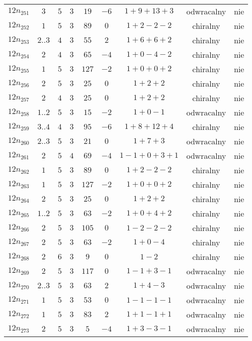 \begin{longtable}{ccccccccc}
$12n_{251}$ & $3$ & $5$ & $3$ & $19$ & $-6$ & $1+9+13+3$ & odwracalny & nie \\
$12n_{252}$ & $1$ & $5$ & $3$ & $89$ & $0$ & $1+2-2-2$ & chiralny & nie \\
$12n_{253}$ & $2..3$ & $4$ & $3$ & $55$ & $2$ & $1+6+6+2$ & chiralny & nie \\
$12n_{254}$ & $2$ & $4$ & $3$ & $65$ & $-4$ & $1+0-4-2$ & chiralny & nie \\
$12n_{255}$ & $1$ & $5$ & $3$ & $127$ & $-2$ & $1+0+0+2$ & chiralny & nie \\
$12n_{256}$ & $2$ & $5$ & $3$ & $25$ & $0$ & $1+2+2$ & chiralny & nie \\
$12n_{257}$ & $2$ & $4$ & $3$ & $25$ & $0$ & $1+2+2$ & chiralny & nie \\
$12n_{258}$ & $1..2$ & $5$ & $3$ & $15$ & $-2$ & $1+0-1$ & odwracalny & nie \\
$12n_{259}$ & $3..4$ & $4$ & $3$ & $95$ & $-6$ & $1+8+12+4$ & chiralny & nie \\
$12n_{260}$ & $2..3$ & $5$ & $3$ & $21$ & $0$ & $1+7+3$ & odwracalny & nie \\
$12n_{261}$ & $2$ & $5$ & $4$ & $69$ & $-4$ & $1-1+0+3+1$ & odwracalny & nie \\
$12n_{262}$ & $1$ & $5$ & $3$ & $89$ & $0$ & $1+2-2-2$ & chiralny & nie \\
$12n_{263}$ & $1$ & $5$ & $3$ & $127$ & $-2$ & $1+0+0+2$ & chiralny & nie \\
$12n_{264}$ & $2$ & $5$ & $3$ & $25$ & $0$ & $1+2+2$ & chiralny & nie \\
$12n_{265}$ & $1..2$ & $5$ & $3$ & $63$ & $-2$ & $1+0+4+2$ & chiralny & nie \\
$12n_{266}$ & $2$ & $5$ & $3$ & $105$ & $0$ & $1-2-2-2$ & chiralny & nie \\
$12n_{267}$ & $2$ & $5$ & $3$ & $63$ & $-2$ & $1+0-4$ & chiralny & nie \\
$12n_{268}$ & $2$ & $6$ & $3$ & $9$ & $0$ & $1-2$ & chiralny & nie \\
$12n_{269}$ & $2$ & $5$ & $3$ & $117$ & $0$ & $1-1+3-1$ & odwracalny & nie \\
$12n_{270}$ & $2..3$ & $5$ & $3$ & $63$ & $2$ & $1+4-3$ & odwracalny & nie \\
$12n_{271}$ & $1$ & $5$ & $3$ & $53$ & $0$ & $1-1-1-1$ & odwracalny & nie \\
$12n_{272}$ & $1$ & $5$ & $3$ & $83$ & $2$ & $1+1-1+1$ & odwracalny & nie \\
$12n_{273}$ & $2$ & $5$ & $3$ & $5$ & $-4$ & $1+3-3-1$ & odwracalny & nie \\

\end{longtable}
